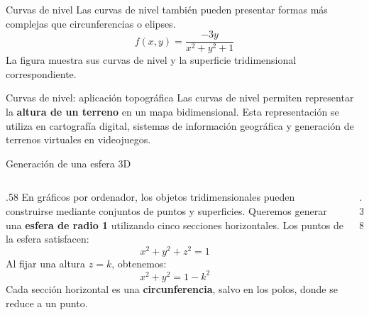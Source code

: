 \documentclass[main.tex]{subfiles}
\begin{document}
\begin{frame}{Curvas de nivel}
Las curvas de nivel también pueden presentar formas más complejas que circunferencias o elipses.
\[
f(x,y)=\frac{-3y}{x^2+y^2+1}
\]
La figura muestra sus curvas de nivel y la superficie tridimensional correspondiente.
\end{frame}
\begin{frame}{Curvas de nivel: aplicación topográfica}
Las curvas de nivel permiten representar la \textbf{altura de un terreno} en un mapa bidimensional.
\medskip
Esta representación se utiliza en cartografía digital, sistemas de información geográfica y generación de terrenos virtuales en videojuegos.
\end{frame}





\begin{frame}{Generación de una esfera 3D}
\begin{columns}[c]
\begin{column}{.58\textwidth}
En gráficos por ordenador, los objetos tridimensionales pueden construirse mediante conjuntos de puntos y superficies.
\medskip
Queremos generar una \textbf{esfera de radio 1} utilizando cinco secciones horizontales.
\medskip
Los puntos de la esfera satisfacen:
\[x^2+y^2+z^2=1\]
Al fijar una altura $z=k$, obtenemos:
\[x^2+y^2=1-k^2\]
Cada sección horizontal es una \textbf{circunferencia}, salvo en los polos, donde se reduce a un punto.
\end{column}
\begin{column}{.38\textwidth}
\centering
{}
\end{column}
\end{columns}
\end{frame}
\end{document}
